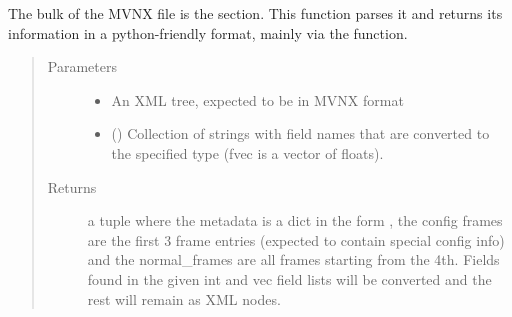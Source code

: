 \documentclass[letterpaper,10pt,english,openany,oneside]{sphinxmanual}
\begin{document}
\begin{fulllineitems}
\begin{fulllineitems}
\begin{quote}
\begin{description}
\end{description}\end{quote}

\end{fulllineitems}


\begin{fulllineitems}
\label{\detokenize{io_anim_mvnx:io_anim_mvnx.mvnx.Mvnx.extract_frames}}
The bulk of the MVNX file is the  section.
This function parses it and returns its information in a
python-friendly format, mainly via the  function.
\begin{quote}\begin{description}
\item[{Parameters}] \leavevmode\begin{itemize}
\item {} 
 \textendash{} An XML tree, expected to be in MVNX format

\item {} 
 () \textendash{} Collection of strings with field names that
are converted to the specified type (fvec is a vector of floats).

\end{itemize}

\item[{Returns}] \leavevmode
a tuple 
where the metadata is a dict in the form , the config frames are the
first 3 frame entries (expected to contain special config info)
and the normal\_frames are all frames starting from the 4th.
Fields found in the given int and vec field lists will be converted
and the rest will remain as XML nodes.

\end{description}\end{quote}


\end{fulllineitems}
\end{fulllineitems}
\end{document}
